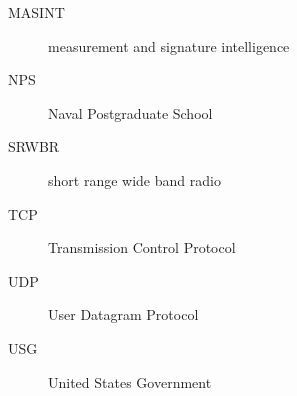 
\begin{description}


\item[MASINT] measurement and signature intelligence
\item[NPS] Naval Postgraduate School
\item[SRWBR] short range wide band radio
\item[TCP] Transmission Control Protocol
\item[UDP] User Datagram Protocol
\item[USG] United States Government
\end{description}







